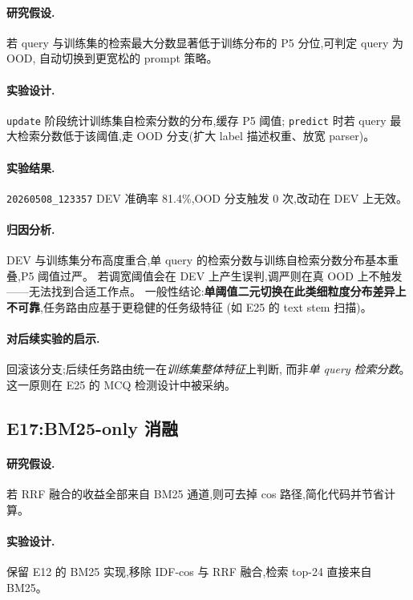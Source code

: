 \documentclass[11pt,a4paper]{ctexart}
\begin{document}
\paragraph{研究假设.}若 query 与训练集的检索最大分数显著低于训练分布的 P5 分位,可判定 query 为 OOD,
自动切换到更宽松的 prompt 策略。

\paragraph{实验设计.}\texttt{update} 阶段统计训练集自检索分数的分布,缓存 P5 阈值;
\texttt{predict} 时若 query 最大检索分数低于该阈值,走 OOD 分支(扩大 label 描述权重、放宽 parser)。

\paragraph{实验结果.}\texttt{20260508\_123357} DEV 准确率 81.4\%,OOD 分支触发 0 次,改动在 DEV 上无效。

\paragraph{归因分析.}DEV 与训练集分布高度重合,单 query 的检索分数与训练自检索分数分布基本重叠,P5 阈值过严。
若调宽阈值会在 DEV 上产生误判,调严则在真 OOD 上不触发——无法找到合适工作点。
一般性结论:\textbf{单阈值二元切换在此类细粒度分布差异上不可靠},任务路由应基于更稳健的任务级特征
(如 E25 的 text stem 扫描)。

\paragraph{对后续实验的启示.}回滚该分支;后续任务路由统一在\textit{训练集整体特征}上判断,
而非\textit{单 query 检索分数}。这一原则在 E25 的 MCQ 检测设计中被采纳。

\subsection{E17:BM25-only 消融}

\paragraph{研究假设.}若 RRF 融合的收益全部来自 BM25 通道,则可去掉 cos 路径,简化代码并节省计算。

\paragraph{实验设计.}保留 E12 的 BM25 实现,移除 IDF-cos 与 RRF 融合,检索 top-24 直接来自 BM25。
\end{document}
